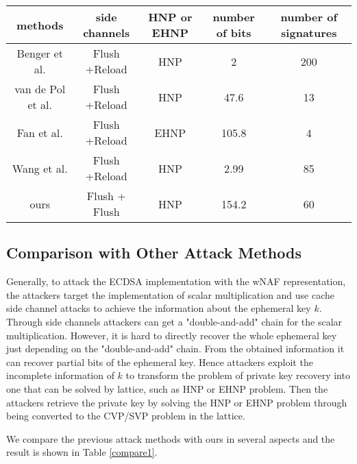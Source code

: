 \begin{table*}[!t]
  \centering
   \caption{Comparison with previous attack methods}\label{compare1}
\begin{tabular}{|c|c|c|c|c|}
  \hline
  methods & side channels & HNP or EHNP & number of bits & number of signatures \\
  \hline
  Benger et al. \cite{Benger2014} & Flush +Reload & HNP & 2 & 200 \\
  \hline
  van de Pol et al. \cite{Van2015} & Flush +Reload & HNP & 47.6 & 13 \\
  \hline
  Fan et al. \cite{Fan2016} & Flush +Reload & EHNP & 105.8 & 4 \\
  \hline
  Wang et al. \cite{Wang2017} & Flush +Reload & HNP & 2.99 & 85 \\
  \hline
  ours & Flush + Flush & HNP & 154.2  & 60 \\
  \hline
\end{tabular}
\end{table*}

\subsection{Comparison with Other Attack Methods}
\label{compare}

 Generally,  to attack the ECDSA implementation with the wNAF representation, 
   the attackers target the implementation of scalar multiplication
      and use cache side channel attacks to achieve the information about the ephemeral key $k$.
Through side channels attackers can get a "double-and-add" chain for the scalar multiplication.
However,
 it is hard to directly recover the whole ephemeral key just depending on the "double-and-add" chain.
From the obtained information it can recover partial bits of the ephemeral key.
Hence attackers exploit the incomplete information of $k$ to transform the problem of private key recovery into one that can be solved by lattice, such as HNP or EHNP problem.
 Then the attackers retrieve the private key by solving the HNP or EHNP problem through being converted to the CVP/SVP problem in the lattice.

We compare the previous attack methods with ours in several aspects and the result is shown in Table \ref{compare1}.

